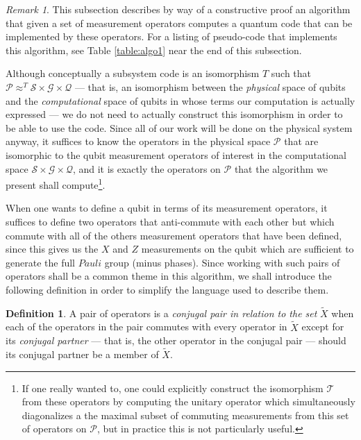 \documentclass[12pt]{amsbook}
\theoremstyle{plain}
\theoremstyle{definition}
\newtheorem{definition}{Definition}
\theoremstyle{remark}
\newtheorem{remark}{Remark}
\newcommand{\set}{\tilde}
\begin{document}
\begin{remark}
This subsection describes by way of a constructive proof an algorithm that given a set of measurement operators computes a quantum code that can be implemented by these operators.  For a listing of pseudo-code that implements this algorithm, see Table \ref{table:algo1} near the end of this subsection.
\end{remark}
Although conceptually a subsystem code is an isomorphism $T$ such that  $\mathscr{P}\approx^T \mathscr{S}\times\mathscr{G}\times\mathscr{Q}$ --- that is, an isomorphism between the \emph{physical} space of qubits and the \emph{computational} space of qubits in whose terms our computation is actually expressed --- we do not need to actually construct this isomorphism in order to be able to use the code.  Since all of our work will be done on the physical system anyway, it suffices to know the operators in the physical space $\mathscr{P}$ that are isomorphic to the qubit measurement operators of interest in the computational space $\mathscr{S}\times\mathscr{G}\times\mathscr{Q}$, and it is exactly the operators on $\mathscr{P}$ that the algorithm we present shall compute\footnote{If one really wanted to, one could explicitly construct the isomorphism $\mathscr{T}$ from these operators by computing the unitary operator which simultaneously diagonalizes a the maximal subset of commuting measurements from this set of operators on $\mathscr{P}$, but in practice this is not particularly useful.}.

When one wants to define a qubit in terms of its measurement operators, it suffices to define two operators that anti-commute with each other but which commute with all of the others measurement operators that have been defined, since this gives us the $X$ and $Z$ measurements on the qubit which are sufficient to generate the full $Pauli$ group (minus phases).  Since working with such pairs of operators shall be a common theme in this algorithm, we shall introduce the following definition in order to simplify the language used to describe them.

\begin{definition} A pair of operators is a \emph{conjugal pair in relation to the set} $\set X$ when each of the operators in the pair commutes with every operator in $\set X$ except for its \emph{conjugal partner} --- that is, the other operator in the conjugal pair --- should its conjugal partner be a member of $\set X$.
\label{conjugal-pair-definition}
\end{definition}
\end{document}
